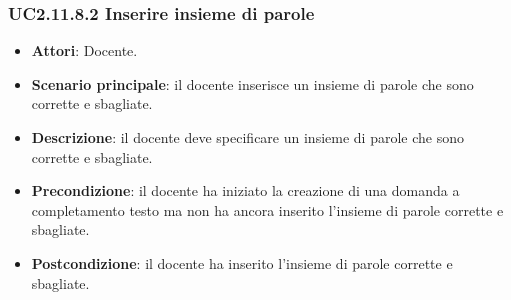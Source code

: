 \subsubsection{UC2.11.8.2 Inserire insieme di parole}
\begin{itemize}
\item \textbf{Attori}: Docente.
\item \textbf{Scenario principale}: il docente inserisce un insieme di parole che sono corrette e sbagliate.
\item \textbf{Descrizione}: il docente deve specificare un insieme di parole che sono corrette e sbagliate.
\item \textbf{Precondizione}:  il docente ha iniziato la creazione di una domanda a completamento testo ma non ha ancora inserito l'insieme di parole corrette e sbagliate.
\item \textbf{Postcondizione}: il docente ha inserito l'insieme di parole corrette e sbagliate.
\end{itemize}
